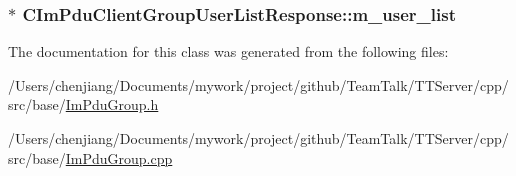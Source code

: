 \subsubsection[{m\+\_\+user\+\_\+list}]{$\ast$ C\+Im\+Pdu\+Client\+Group\+User\+List\+Response\+::m\+\_\+user\+\_\+list\hspace{0.3cm}{\ttfamily [private]}}\label{class_c_im_pdu_client_group_user_list_response_a75c6582909b6c35fc9d48d1b859ee660}


The documentation for this class was generated from the following files\+:\begin{DoxyCompactItemize}
\item 
/\+Users/chenjiang/\+Documents/mywork/project/github/\+Team\+Talk/\+T\+T\+Server/cpp/src/base/\hyperlink{_im_pdu_group_8h}{Im\+Pdu\+Group.\+h}\item 
/\+Users/chenjiang/\+Documents/mywork/project/github/\+Team\+Talk/\+T\+T\+Server/cpp/src/base/\hyperlink{_im_pdu_group_8cpp}{Im\+Pdu\+Group.\+cpp}\end{DoxyCompactItemize}
